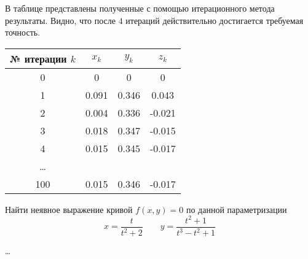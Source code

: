 В таблице представлены полученные с помощью итерационного метода результаты.
Видно, что после $4$ итераций действительно достигается требуемая точность.
\begin{center}
\begin{tabular}{c|c|c|c}
    № итерации $k$ & $x_k$ & $y_k$ & $z_k$\\
    \hline
    0 & 0 & 0 & 0 \\ \hline
    1 & 0.091 & 0.346 & 0.043 \\ \hline
    2 & 0.004 & 0.336 & -0.021 \\ \hline
    3 & 0.018 & 0.347 & -0.015 \\ \hline
    4 & 0.015 & 0.345 & -0.017 \\ \hline
    \ldots & & & \\ \hline
    100 &  0.015 & 0.346 & -0.017\\
\end{tabular}
\end{center}


\begin{problem}
    Найти неявное выражение кривой $f(x, y) = 0$ по данной параметризации
    \begin{equation*}
        x = \frac{t}{t^2 + 2}
        \qquad
        y = \frac{t^2 + 1}{t^3 - t^2 + 1}
    \end{equation*}
\end{problem}

\ldots